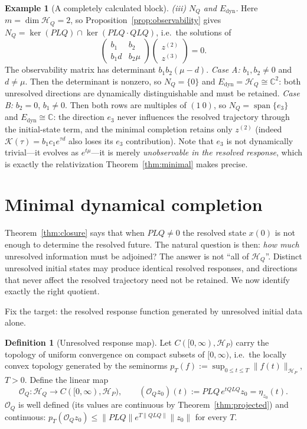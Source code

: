 \documentclass[11pt,reqno]{amsart}
\numberwithin{equation}{section}
\theoremstyle{plain}
\theoremstyle{definition}
\newtheorem{definition}[theorem]{Definition}
\newtheorem{example}[theorem]{Example}
\theoremstyle{remark}
\newcommand{\HP}{\mathcal{H}_{P}}
\newcommand{\HQ}{\mathcal{H}_{Q}}
\newcommand{\Edyn}{E_{\mathrm{dyn}}}
\newcommand{\Op}{\mathcal{O}_{Q}}
\newcommand{\Kmem}{\mathcal{K}}
\DeclareMathOperator{\spanset}{span}
\begin{document}
\begin{example}[A completely calculated block]
\smallskip
\noindent\emph{(iii) $N_{Q}$ and $\Edyn$.} Here $m=\dim\HQ=2$, so
Proposition~\ref{prop:observability} gives
$N_{Q}=\ker(PLQ)\cap\ker(PLQ\cdot QLQ)$, i.e.\ the solutions of
\[
\begin{pmatrix} b_{1} & b_{2}\\ b_{1}d & b_{2}\mu\end{pmatrix}
\begin{pmatrix}z^{(2)}\\ z^{(3)}\end{pmatrix}=0 .
\]
The observability matrix has determinant $b_{1}b_{2}(\mu-d)$.
\emph{Case A:} $b_{1},b_{2}\neq0$ and $d\neq\mu$. Then the determinant is nonzero, so
$N_{Q}=\{0\}$ and $\Edyn=\HQ\cong\mathbb{C}^{2}$: both unresolved directions are dynamically
distinguishable and must be retained.
\emph{Case B:} $b_{2}=0$, $b_{1}\neq0$. Then both rows are multiples of
$(1\ 0)$, so $N_{Q}=\spanset\{e_{3}\}$ and $\Edyn\cong\mathbb{C}$: the direction $e_{3}$
never influences the resolved trajectory through the initial-state term, and the minimal
completion retains only $z^{(2)}$ (indeed $\Kmem(\tau)=b_{1}c_{1}e^{\tau d}$ also loses its
$e_3$ contribution). Note that $e_{3}$ is not dynamically trivial---it evolves as
$e^{t\mu}$---it is merely \emph{unobservable in the resolved response}, which is exactly the
relativization Theorem~\ref{thm:minimal} makes precise.
\end{example}

\section{Minimal dynamical completion}
\label{sec:completion}

Theorem~\ref{thm:closure} says that when $PLQ\neq0$ the resolved state $x(0)$ is not enough
to determine the resolved future. The natural question is then: \emph{how much} unresolved
information must be adjoined? The answer is not ``all of $\HQ$''. Distinct unresolved initial
states may produce identical resolved responses, and directions that never affect the
resolved trajectory need not be retained. We now identify exactly the right quotient.

Fix the target: the resolved response function generated by unresolved initial data alone.

\begin{definition}[Unresolved response map]
\label{def:response}
Let $C([0,\infty),\HP)$ carry the topology of uniform convergence on compact subsets of
$[0,\infty)$, i.e.\ the locally convex topology generated by the seminorms
$p_{T}(f):=\sup_{0\le t\le T}\lVert f(t)\rVert_{\HP}$, $T>0$. Define the linear map
\begin{equation}
\label{eq:OQ}
\Op:\HQ\longrightarrow C([0,\infty),\HP),
\qquad
(\Op z_{0})(t):=PLQ\,e^{tQLQ}z_{0}=\eta_{z_{0}}(t).
\end{equation}
$\Op$ is well defined (its values are continuous by Theorem~\ref{thm:projected}) and
continuous: $p_{T}(\Op z_{0})\le\lVert PLQ\rVert e^{T\lVert QLQ\rVert}\lVert z_{0}\rVert$
for every $T$.
\end{definition}
\end{document}
